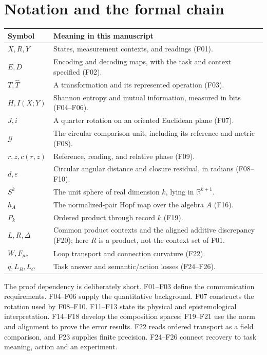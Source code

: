 \documentclass[11pt,a4paper]{article}
\newcommand{\R}{\mathbb{R}}
\begin{document}
\section{Notation and the formal chain}
\label{app:notation}
\noindent\begin{tabularx}{\linewidth}{@{}p{25mm}>{\raggedright\arraybackslash}X@{}}
\toprule Symbol & Meaning in this manuscript\\\midrule
$X,R,Y$ & States, measurement contexts, and readings (F01).\\
$E,D$ & Encoding and decoding maps, with the task and context specified (F02).\\
$T,\widehat T$ & A transformation and its represented operation (F03).\\
$H,I(X;Y)$ & Shannon entropy and mutual information, measured in bits (F04--F06).\\
$J,i$ & A quarter rotation on an oriented Euclidean plane (F07).\\
$\mathcal G$ & The circular comparison unit, including its reference and metric (F08).\\
$r,z,c(r,z)$ & Reference, reading, and relative phase (F09).\\
$d,\varepsilon$ & Circular angular distance and closure residual, in radians (F08--F10).\\
$S^k$ & The unit sphere of real dimension $k$, lying in $\R^{k+1}$.\\
$h_A$ & The normalized-pair Hopf map over the algebra $A$ (F16).\\
$P_k$ & Ordered product through record $k$ (F19).\\
$L,R,\Delta$ & Common product contexts and the aligned additive discrepancy (F20);
 here $R$ is a product, not the context set of F01.\\
$W,F_{\mu\nu}$ & Loop transport and connection curvature (F22).\\
$q,L_B,L_C$ & Task answer and semantic/action losses (F24--F26).\\
\bottomrule
\end{tabularx}

The proof dependency is deliberately short. F01--F03 define the communication
requirements. F04--F06 supply the quantitative background. F07 constructs the
rotation used by F08--F10. F11--F13 state its physical and epistemological
interpretation. F14--F18 develop the composition spaces; F19--F21 use the norm
and alignment to prove the error results. F22 reads ordered transport as a
field comparison, and F23 supplies finite precision. F24--F26 connect recovery
to task meaning, action and an experiment.
\end{document}
